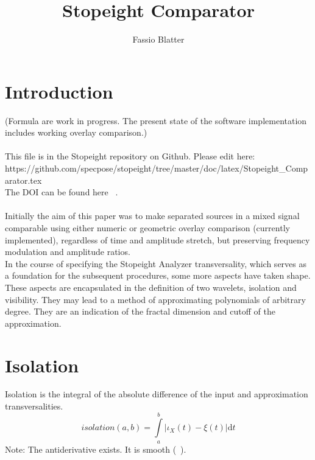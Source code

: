 \documentclass{report}
\begin{document}
\title{Stopeight Comparator}
\author{Fassio Blatter}
\maketitle

\chapter{Introduction}
(Formula are work in progress. The present state of the software implementation includes working overlay comparison.)\\\\
This file is in the Stopeight repository on Github. Please edit here:\\
https://github.com/specpose/stopeight/tree/master/doc/latex/Stopeight\_Comparator.tex\\
The DOI can be found here ~\cite{Stopeight}.\\\\
Initially the aim of this paper was to make separated sources in a mixed signal comparable using either numeric or geometric overlay comparison (currently implemented), regardless of time and amplitude stretch, but preserving frequency modulation and amplitude ratios.\\
In the course of specifying the Stopeight Analyzer transversality, which serves as a foundation for the subsequent procedures, some more aspects have taken shape. These aspects are encapsulated in the definition of two wavelets, isolation and visibility. They may lead to a method of approximating polynomials of arbitrary degree. They are an indication of the fractal dimension and cutoff of the approximation.

\chapter{Isolation}
Isolation is the integral of the absolute difference of the input and approximation transversalities.
\begin{equation}
isolation(a,b)=\int \limits _{a}^{b} \vert\iota_{X}(t)-\xi(t)\vert \mathrm{d}t
\end{equation}
Note: The antiderivative exists. It is smooth (~\cite[Riemann Integrable]{Widon}).\\\\
\end{document}
